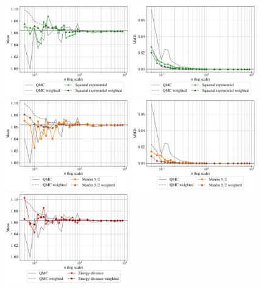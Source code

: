\begin{figure}[!h]
\begin{center}
    \includegraphics[width=0.48\textwidth]{part2/figures/DCE/analytical_bench/Gaussian_Mixture_convergence_SE.pdf}
    \includegraphics[width=0.48\textwidth]{part2/figures/DCE/analytical_bench/Gaussian_Mixture_convergence_MMD_SE.pdf}\\
    \includegraphics[width=0.48\textwidth]{part2/figures/DCE/analytical_bench/Gaussian_Mixture_convergence_Matern.pdf}
    \includegraphics[width=0.48\textwidth]{part2/figures/DCE/analytical_bench/Gaussian_Mixture_convergence_MMD_Matern.pdf}\\
    \includegraphics[width=0.48\textwidth]{part2/figures/DCE/analytical_bench/Gaussian_Mixture_convergence_ED.pdf}

\end{center}
\end{figure}

